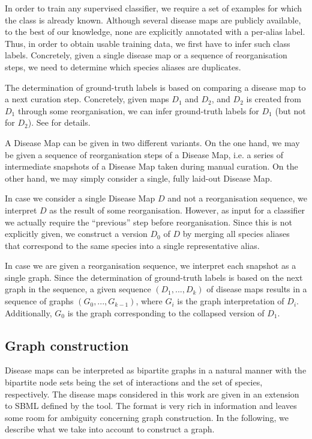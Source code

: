 \documentclass[
	fontsize=10pt, %
	twoside=false, %
	secnumdepth=1, %
  toc=indentunnumbered %
]{kaobook}
\begin{document}
In order to train any supervised classifier, we require a set of examples for
which the class is already known. Although several disease maps are publicly
available, to the best of our knowledge, none are explicitly annotated with a
per-alias label. Thus, in order to obtain usable training data, we first have to
infer such class labels. Concretely, given a single disease map or a sequence of
reorganisation steps, we need to determine which species aliases are duplicates.

The determination of ground-truth labels is based on comparing a disease map to
a next curation step. Concretely, given maps $D_1$ and $D_2$, and $D_2$ is
created from $D_1$ through some reorganisation, we can infer ground-truth
labels for $D_1$ (but not for $D_2$). See  for details.

A Disease Map can be given in two different variants. On the one hand, we may be
given a sequence of reorganisation steps of a Disease Map, i.e. a series of intermediate
snapshots of a Disease Map taken during manual curation. On the other hand, we
may simply consider a single, fully laid-out Disease Map.

In case we consider a single Disease Map $D$ and not a reorganisation sequence,
we interpret $D$ as the result of some reorganisation. However, as input for a
classifier we actually require the ``previous'' step before reorganisation.
Since this is not explicitly given, we construct a  version $D_0$
of $D$ by merging all species aliases that correspond to the same species into a
single representative alias.

In case we are given a reorganisation sequence, we interpret each snapshot as a
single graph. Since the determination of ground-truth labels is based on the
next graph in the sequence, a given sequence $(D_1, ..., D_k)$ of disease maps
results in a sequence of graphs $(G_0, ..., G_{k-1})$, where $G_i$ is the graph
interpretation of $D_i$. Additionally, $G_0$ is the graph corresponding to the
collapsed version of $D_1$.



\subsection{Graph construction}
\label{sec:graph-interpretation}
Disease maps can be interpreted as bipartite graphs in a natural manner with the
bipartite node sets being the set of interactions and the set of species,
respectively. The disease maps considered in this work are given in an extension
to SBML defined by the  tool. The format is very rich in
information and leaves some room for ambiguity concerning graph construction. In
the following, we describe what we take into account to construct a graph.
\end{document}
